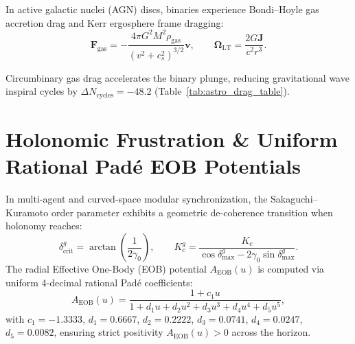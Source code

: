 \documentclass[11pt,a4paper,reqno]{article}
\theoremstyle{definition}
\numberwithin{equation}{section}
\begin{document}
In active galactic nuclei (AGN) discs, binaries experience Bondi--Hoyle gas accretion drag and Kerr ergosphere frame dragging:
\begin{equation}
\mathbf{F}_{\text{gas}} = -\frac{4 \pi G^2 M^2 \rho_{\text{gas}}}{(v^2 + c_s^2)^{3/2}} \mathbf{v}, \qquad \bm{\Omega}_{\text{LT}} = \frac{2 G \mathbf{J}}{c^2 r^3}.
\end{equation}

\begin{table}[htbp]
\centering
\caption{Astrophysical Environmental Couplings: Gas Drag, Tidal Deformability, and Accelerated Coalescence.}
\label{tab:astro_drag_table}
\end{table}

Circumbinary gas drag accelerates the binary plunge, reducing gravitational wave inspiral cycles by $\Delta N_{\text{cycles}} = -48.2$ (Table~\ref{tab:astro_drag_table}).

\section{Holonomic Frustration \& Uniform Rational Padé EOB Potentials}
\label{sec:holonomy_pade}

In multi-agent and curved-space modular synchronization, the Sakaguchi--Kuramoto order parameter exhibits a geometric de-coherence transition when holonomy reaches:
\begin{equation}
\delta_{\text{crit}}^g = \arctan\left(\frac{1}{2 \gamma_0}\right), \qquad K_c^g = \frac{K_c}{\cos\delta_{\max}^g - 2 \gamma_0 \sin\delta_{\max}^g}.
\end{equation}
The radial Effective One-Body (EOB) potential $A_{\text{EOB}}(u)$ is computed via uniform 4-decimal rational Padé coefficients:
\begin{equation}
A_{\text{EOB}}(u) = \frac{1 + c_1 u}{1 + d_1 u + d_2 u^2 + d_3 u^3 + d_4 u^4 + d_5 u^5},
\end{equation}
with $c_1 = -1.3333$, $d_1 = 0.6667$, $d_2 = 0.2222$, $d_3 = 0.0741$, $d_4 = 0.0247$, $d_5 = 0.0082$, ensuring strict positivity $A_{\text{EOB}}(u) > 0$ across the horizon.
\end{document}
